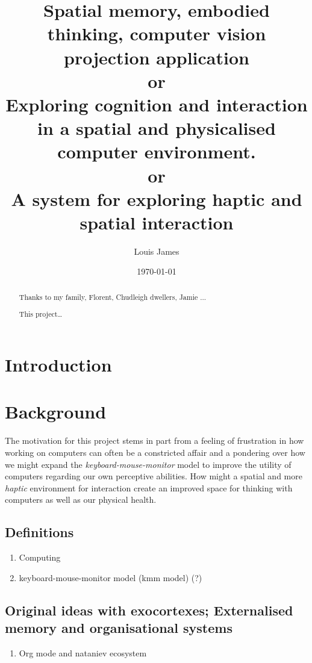 \documentclass[12pt]{report}
\author{Louis James}
\date{\today}
\title{Spatial memory, embodied thinking, computer vision projection application \\
or \\
Exploring cognition and interaction in a spatial and physicalised computer environment. \\
or \\
A system for exploring haptic and spatial interaction}
\begin{document}
\maketitle

\renewcommand{\abstractname}{Acknowledgements}
\begin{abstract}
 Thanks to my family, Florent, Chudleigh dwellers, Jamie ...
\end{abstract}
\newpage

\renewcommand{\abstractname}{Abstract}
\begin{abstract}
This project\ldots{}
\end{abstract}
\tableofcontents
\chapter{Introduction}
\label{sec:org1522a59}
\chapter{Background}
\label{sec:orgbbdfea8}

The motivation for this project stems in part from a feeling of frustration in
how working on computers can often be a constricted affair and a pondering over
how we might expand the \emph{keyboard-mouse-monitor} model to improve the utility of
computers regarding our own perceptive abilities. How might a spatial and more
\emph{haptic} environment for interaction create an improved space for thinking with
computers as well as our physical health.

\section{Definitions}
\label{sec:org44458f9}
\begin{enumerate}
\item Computing
\label{sec:orgafa46fb}
\item keyboard-mouse-monitor model (kmm model) (?)
\label{sec:org95e3242}
\end{enumerate}

\section{Original ideas with exocortexes; Externalised memory and organisational systems}
\label{sec:org9781d8c}

\begin{enumerate}
\item Org mode and nataniev ecosystem
\label{sec:orge8a9cd4}
\end{enumerate}
\end{document}
